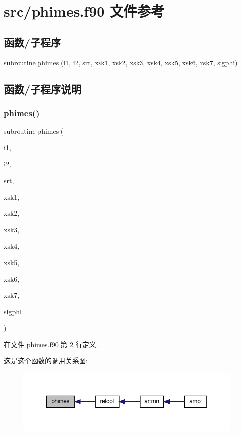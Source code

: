 \hypertarget{phimes_8f90}{}\section{src/phimes.f90 文件参考}
\label{phimes_8f90}
\subsection*{函数/子程序}
\begin{DoxyCompactItemize}
\item 
subroutine \mbox{\hyperlink{phimes_8f90_a9c00957f23ab5278e1556c90adce8771}{phimes}} (i1, i2, srt, xsk1, xsk2, xsk3, xsk4, xsk5, xsk6, xsk7, sigphi)
\end{DoxyCompactItemize}


\subsection{函数/子程序说明}
\mbox{\label{phimes_8f90_a9c00957f23ab5278e1556c90adce8771}} 
\subsubsection{\texorpdfstring{phimes()}{phimes()}}
{\footnotesize\ttfamily subroutine phimes (\begin{DoxyParamCaption}\item[{}]{i1,  }\item[{}]{i2,  }\item[{}]{srt,  }\item[{}]{xsk1,  }\item[{}]{xsk2,  }\item[{}]{xsk3,  }\item[{}]{xsk4,  }\item[{}]{xsk5,  }\item[{}]{xsk6,  }\item[{}]{xsk7,  }\item[{}]{sigphi }\end{DoxyParamCaption})}



在文件 phimes.\+f90 第 2 行定义.

这是这个函数的调用关系图\+:
\nopagebreak
\begin{figure}[H]
\begin{center}
\leavevmode
\includegraphics[width=350pt]{phimes_8f90_a9c00957f23ab5278e1556c90adce8771_icgraph}
\end{center}
\end{figure}
